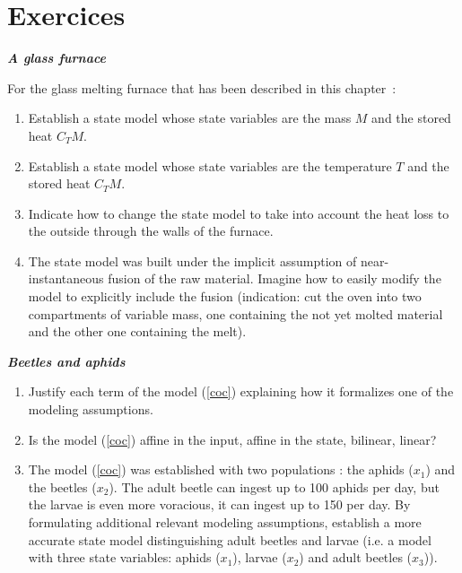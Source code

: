 \section{Exercices}

\begin{exercice} {\bf \em A glass furnace}

For the glass melting furnace that has been described in this chapter~:
\begin{enumerate}
\item Establish a state model whose state variables are the mass $M$ and the stored heat $C_TM$.
\item Establish a state model whose state variables are the temperature $T$ and the stored heat $C_TM$.
\item Indicate how to change the state model to take into account the heat loss to the outside through the walls of the furnace.
\item The state model was built under the implicit assumption of near-instantaneous fusion of the raw material. Imagine how to easily modify the model to explicitly include the fusion (indication: cut the oven into two compartments of variable mass, one containing the not yet molted material and the other one containing the melt).
\end{enumerate}
\end{exercice}

\begin{exercice}{\bf \em Beetles and aphids}

\begin{enumerate}
\item Justify each term of the model (\ref{coc}) explaining how it formalizes one of the modeling assumptions.
\item Is the model (\ref{coc}) affine in the input, affine in the state, bilinear, linear? 
\item The model (\ref{coc}) was established with two populations : the aphids ($x_1$) and the beetles ($x_2$). The adult beetle can ingest up to 100 aphids per day, but the larvae is even more voracious, it can ingest up to 150 per day. By formulating additional relevant modeling assumptions, establish a more accurate state model distinguishing adult beetles and larvae (i.e. a model with three state variables: aphids ($x_1$), larvae ($x_2$) and adult beetles ($x_3$)).
\end{enumerate}
\end{exercice}




